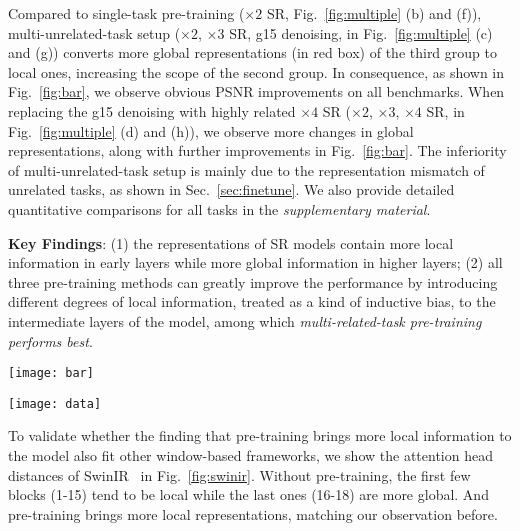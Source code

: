 \documentclass[runningheads]{llncs}
\begin{document}
	Compared to single-task pre-training ($\times 2$ SR, Fig.~\ref{fig:multiple} (b) and (f)), multi-unrelated-task setup ($\times 2$, $\times 3$ SR, g15 denoising, in Fig.~\ref{fig:multiple} (c) and (g)) converts more global representations (in red box) of the third group to local ones, increasing the scope of the second group. In consequence, as shown in Fig.~\ref{fig:bar}, we observe obvious PSNR improvements on all benchmarks. When replacing the g15 denoising with highly related $\times 4$ SR ($\times 2$, $\times 3$, $\times 4$ SR, in Fig.~\ref{fig:multiple} (d) and (h)), we observe more changes in global representations, along with further improvements in Fig.~\ref{fig:bar}. The inferiority of multi-unrelated-task setup is mainly due to the representation mismatch of unrelated tasks, as shown in Sec.~\ref{sec:finetune}. We also provide detailed quantitative comparisons for all tasks in the \textit{supplementary material}.
	




	\vspace{0.05in}
	\noindent\textbf{Key Findings}: (1) the representations of SR models contain more local information in early layers while more global information in higher layers; (2) all three pre-training methods can greatly improve the performance by introducing different degrees of local information, treated as a kind of inductive bias, to the intermediate layers of the model, among which \textit{multi-related-task pre-training performs best}.
	
	\begin{table}[t]
		\begin{minipage}[c]{0.49\linewidth}
			\centering
			\texttt{[image: bar]}
			\label{fig:bar}
		\end{minipage}\hfill
		\begin{minipage}[c]{0.48\linewidth}
			\centering
			\texttt{[image: data]}
			\label{fig:data}
		\end{minipage}
		\vspace{-0.15in}
	\end{table}
	
	To validate whether the finding that pre-training brings more local information to the model also fit other window-based frameworks, we show the attention head distances of SwinIR~\cite{liang2021swinir} in Fig.~\ref{fig:swinir}. Without pre-training, the first few blocks (1-15) tend to be local while the last ones (16-18) are more global. And pre-training brings more local representations, matching our observation before.
	
\end{document}
